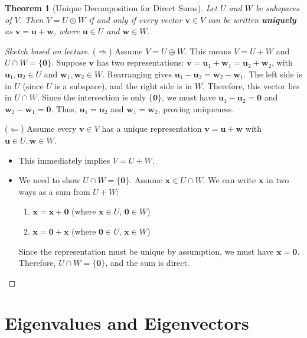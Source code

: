 \documentclass[11pt]{article}
\newtheorem{theorem}{Theorem}[section]
\theoremstyle{definition}
\theoremstyle{remark}
\begin{document}
\begin{theorem}[Unique Decomposition for Direct Sums]
Let $U$ and $W$ be subspaces of $V$. Then $V = U \oplus W$ if and only if every vector $\mathbf{v} \in V$ can be written \textbf{uniquely} as $\mathbf{v} = \mathbf{u} + \mathbf{w}$, where $\mathbf{u} \in U$ and $\mathbf{w} \in W$.
\end{theorem}
\begin{proof}[Sketch based on lecture]
($\Rightarrow$) Assume $V = U \oplus W$. This means $V = U+W$ and $U \cap W = \{\mathbf{0}\}$. Suppose $\mathbf{v}$ has two representations: $\mathbf{v} = \mathbf{u}_1 + \mathbf{w}_1 = \mathbf{u}_2 + \mathbf{w}_2$, with $\mathbf{u}_1, \mathbf{u}_2 \in U$ and $\mathbf{w}_1, \mathbf{w}_2 \in W$. Rearranging gives $\mathbf{u}_1 - \mathbf{u}_2 = \mathbf{w}_2 - \mathbf{w}_1$. The left side is in $U$ (since $U$ is a subspace), and the right side is in $W$. Therefore, this vector lies in $U \cap W$. Since the intersection is only $\{\mathbf{0}\}$, we must have $\mathbf{u}_1 - \mathbf{u}_2 = \mathbf{0}$ and $\mathbf{w}_2 - \mathbf{w}_1 = \mathbf{0}$. Thus, $\mathbf{u}_1 = \mathbf{u}_2$ and $\mathbf{w}_1 = \mathbf{w}_2$, proving uniqueness.

($\Leftarrow$) Assume every $\mathbf{v} \in V$ has a unique representation $\mathbf{v} = \mathbf{u} + \mathbf{w}$ with $\mathbf{u} \in U, \mathbf{w} \in W$.
\begin{itemize}
    \item This immediately implies $V = U+W$.
    \item We need to show $U \cap W = \{\mathbf{0}\}$. Assume $\mathbf{x} \in U \cap W$. We can write $\mathbf{x}$ in two ways as a sum from $U+W$:
        \begin{enumerate}
            \item $\mathbf{x} = \mathbf{x} + \mathbf{0}$ (where $\mathbf{x} \in U$, $\mathbf{0} \in W$)
            \item $\mathbf{x} = \mathbf{0} + \mathbf{x}$ (where $\mathbf{0} \in U$, $\mathbf{x} \in W$)
        \end{enumerate}
        Since the representation must be unique by assumption, we must have $\mathbf{x} = \mathbf{0}$. Therefore, $U \cap W = \{\mathbf{0}\}$, and the sum is direct.
\end{itemize}
\end{proof}

\section{Eigenvalues and Eigenvectors}
\end{document}

